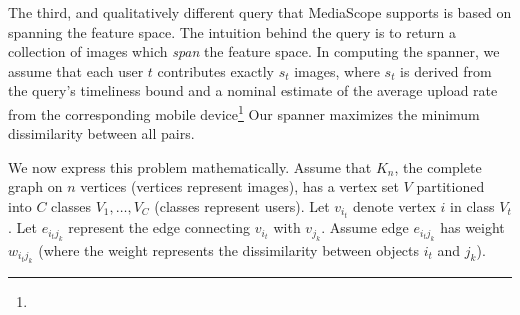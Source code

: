 
\fi

%
The third, and qualitatively different query that MediaScope supports
is based on spanning the feature space.
%
The intuition behind the query is to return a collection of images
which \emph{span} the feature space.
%
In computing the spanner, we assume that each user $t$ contributes
exactly $s_t$ images, where $s_t$ is derived from the query's
timeliness bound and a nominal estimate of the average upload rate
from the corresponding mobile device\footnote{ }
%
Our spanner maximizes the minimum dissimilarity between all pairs.
%

We now express this problem mathematically.
%
Assume that $K_n$, the complete graph on $n$ vertices (vertices
represent images), has a vertex set $V$ partitioned into $C$ classes
$V_{1},\ldots,V_{C}$ (classes represent users).
%
Let $v_{i_t}$ denote vertex $i$ in class $V_t$.
%
Let $e_{i_t j_k}$ represent the edge connecting $v_{i_t}$ with
$v_{j_k}$.
%
Assume edge $e_{i_tj_k}$ has weight $w_{i_tj_k}$ (where the weight
represents the dissimilarity between objects $i_t$ and $j_k$).

